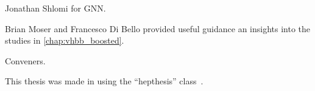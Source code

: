 



Jonathan Shlomi for GNN.

Brian Moser and Francesco Di Bello provided useful guidance an insights into the studies in \cref{chap:vhbb_boosted}.

Conveners.

This thesis was made in \LaTeXe{} using the ``hepthesis'' class~\cite{Buckley:2010:hepthesis}.



